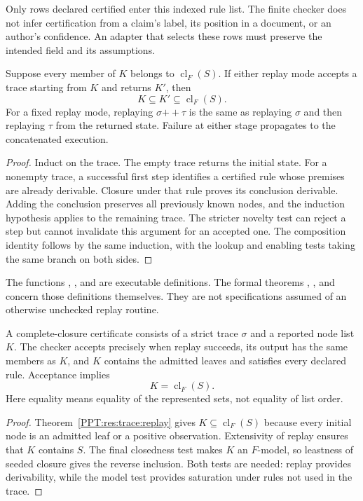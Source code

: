 Only rows declared certified enter this indexed rule list. The finite checker does not infer certification from a claim's label, its position in a document, or an author's confidence. An adapter that selects these rows must preserve the intended field and its assumptions.

\begin{PPTtheorem}
\label{PPT:res:trace:replay}
Suppose every member of $K$ belongs to $\operatorname{cl}_F(S)$. If either replay mode accepts a trace starting from $K$ and returns $K'$, then
\[
 K\subseteq K'\subseteq\operatorname{cl}_F(S).
\]
For a fixed replay mode, replaying $\sigma\mathbin{+\!+}\tau$ is the same as replaying $\sigma$ and then replaying $\tau$ from the returned state. Failure at either stage propagates to the concatenated execution.
\end{PPTtheorem}
\begin{proof}
Induct on the trace. The empty trace returns the initial state. For a nonempty trace, a successful first step identifies a certified rule whose premises are already derivable. Closure under that rule proves its conclusion derivable. Adding the conclusion preserves all previously known nodes, and the induction hypothesis applies to the remaining trace. The stricter novelty test can reject a step but cannot invalidate this argument for an accepted one. The composition identity follows by the same induction, with the lookup and enabling tests taking the same branch on both sides.
\end{proof}

The functions , , and  are executable definitions. The formal theorems , , and  concern those definitions themselves. They are not specifications assumed of an otherwise unchecked replay routine.

\begin{PPTtheorem}
\label{PPT:res:trace:least}
A complete-closure certificate consists of a strict trace $\sigma$ and a reported node list $K$. The checker accepts precisely when replay succeeds, its output has the same members as $K$, and $K$ contains the admitted leaves and satisfies every declared rule. Acceptance implies
\[
 \boxed{K=\operatorname{cl}_F(S).}
\]
Here equality means equality of the represented sets, not equality of list order.
\end{PPTtheorem}
\begin{proof}
Theorem~\ref{PPT:res:trace:replay} gives $K\subseteq\operatorname{cl}_F(S)$ because every initial node is an admitted leaf or a positive observation. Extensivity of replay ensures that $K$ contains $S$. The final closedness test makes $K$ an $F$-model, so leastness of seeded closure gives the reverse inclusion. Both tests are needed: replay provides derivability, while the model test provides saturation under rules not used in the trace.
\end{proof}

